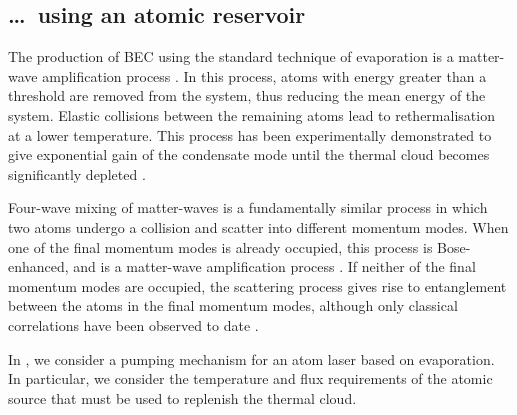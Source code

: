 \subsection{\dots\ using an atomic reservoir}

The production of BEC using the standard technique of evaporation \citep{Hess:1986,Ketterle:1996} is a matter-wave amplification process \citep{Luiten:1996,Gardiner:1997uq,Miesner:1998}.  In this process, atoms with energy greater than a threshold are removed from the system, thus reducing the mean energy of the system.  Elastic collisions between the remaining atoms lead to rethermalisation at a lower temperature.  This process has been experimentally demonstrated to give exponential gain of the condensate mode until the thermal cloud becomes significantly depleted \citep{Miesner:1998}.

Four-wave mixing of matter-waves \citep{Deng:1999qy} is a fundamentally similar process in which two atoms undergo a collision and scatter into different momentum modes.  When one of the final momentum modes is already occupied, this process is Bose-enhanced, and is a matter-wave amplification process \citep{Vogels:2002}.  If neither of the final momentum modes are occupied, the scattering process gives rise to entanglement between the atoms in the final momentum modes, although only classical correlations have been observed to date \citep{Perrin:2007}.

In , we consider a pumping mechanism for an atom laser based on evaporation.  In particular, we consider the temperature and flux requirements of the atomic source that must be used to replenish the thermal cloud.



